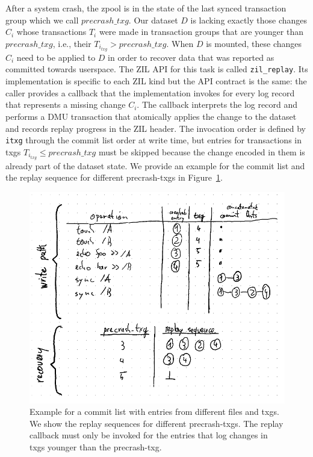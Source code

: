 \documentclass[12pt,a4paper,twoside]{book}
\begin{document}
After a system crash, the zpool is in the state of the last synced transaction group which we call $precrash\_txg$.
Our dataset $D$ is lacking exactly those changes $C_i$ whose transactions $T_i$ were made in transaction groups that are younger than $precrash\_txg$, i.e., their $T_{i_{txg}} > precrash\_txg$.
When $D$ is mounted, these changes $C_i$ need to be applied to $D$ in order to recover data that was reported as committed towards userspace.
The ZIL API for this task is called \lstinline{zil_replay}.
Its implementation is specific to each ZIL kind but the API contract is the same:
the caller provides a callback that the implementation invokes for every log record that represents a missing change $C_i$.
The callback interprets the log record and performs a DMU transaction that atomically applies the change to the dataset and records replay progress in the ZIL header.
The invocation order is defined by \lstinline{itxg} through the commit list order at write time, but entries for transactions in txgs $T_{i_{txg}} \le precrash\_txg$ must be skipped because the change encoded in them is already part of the dataset state.
We provide an example for the commit list and the replay sequence for different precrash-txgs in Figure~\ref{fig:zil_writepath_and_replay_sequence_logical_level}.

\begin{figure}[H]
    \centering
    \includegraphics{fig/zil_writepath_and_replay_sequence_logical_level}
    \caption{
        Example for a commit list with entries from different files and txgs.
        We show the replay sequences for different precrash-txgs.
        The replay callback must only be invoked for the entries that log changes in txgs younger than the precrash-txg.
    }
    \label{fig:zil_writepath_and_replay_sequence_logical_level}
\end{figure}
\end{document}
